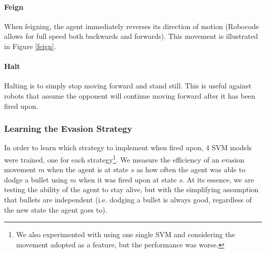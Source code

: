\documentclass{article}
\theoremstyle{plain}
\theoremstyle{definition}
\theoremstyle{remark}
\begin{document}
\paragraph{Feign}
When feigning, the agent immediately reverses its direction of motion (Robocode allows for full speed both backwards and forwards). This movement is illustrated in Figure \ref{feign}.

\paragraph{Halt}
Halting is to simply stop moving forward and stand still. This is useful against robots that assume the opponent will continue moving forward after it has been fired upon.



\subsubsection*{Learning the Evasion Strategy}
In order to learn which strategy to implement when fired upon, 4 SVM models were trained, one for each strategy\footnote{We also experimented with using one single SVM and considering the movement adopted as a feature, but the performance was worse.}. We measure the efficiency of an evasion movement $m$ when the agent is at state $s$ as how often the agent was able to dodge a bullet using $m$ when it was fired upon at state $s$. At its essence, we are testing the ability of the agent to stay alive, but with the simplifying assumption that bullets are independent (i.e. dodging a bullet is always good, regardless of the new state the agent goes to).
\end{document}
